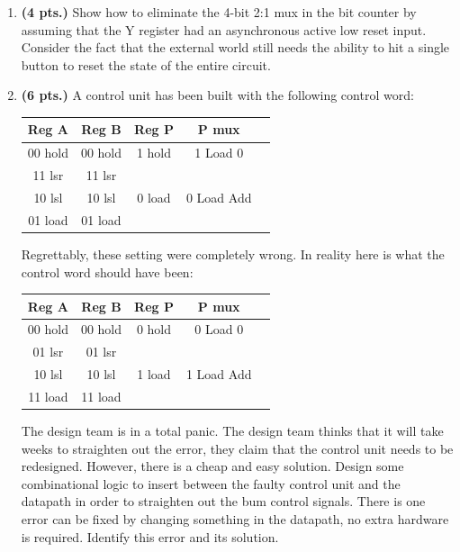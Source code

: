 \begin{enumerate}
\item {\bf (4 pts.)}
Show how to eliminate the 4-bit 2:1 mux in the bit counter by
assuming that the Y register had an asynchronous active low reset input.
Consider the fact that the external world still needs the ability to hit
a single button to reset the state of the entire circuit. 

\item  {\bf (6 pts.)}
A control unit has been built with the following control word:

\begin{tabular}{|c|c|c|c|c|}  \hline
Reg A       & Reg B         &  Reg P        & P mux         \\ \hline
00 hold     & 00 hold       &  1 hold       & 1 Load 0      \\ \hline
11 lsr      & 11 lsr        &               &               \\ \hline
10 lsl      & 10 lsl        &  0 load       & 0 Load Add    \\ \hline
01 load     & 01 load       &               &               \\ \hline 
\end{tabular}

Regrettably, these setting were completely wrong.  In reality here is what the control word should
have been:

\begin{tabular}{|c|c|c|c|c|}  \hline
Reg A       & Reg B         &  Reg P        & P mux         \\ \hline
00 hold     & 00 hold       &  0 hold       & 0 Load 0      \\ \hline
01 lsr      & 01 lsr        &               &               \\ \hline
10 lsl      & 10 lsl        &  1 load       & 1 Load Add    \\ \hline
11 load     & 11 load       &               &               \\ \hline 
\end{tabular}

The design team is in a total panic.
The design team thinks that it will take weeks to straighten out the error, 
they claim that the control unit needs to be redesigned.  However, there is
a cheap and easy solution.  Design some combinational 
logic to insert between the faulty control unit and the datapath in order
to straighten out the bum control signals.  There is one error can be 
fixed by changing something in the datapath, no extra hardware is 
required.  Identify this error and its solution.


\end{enumerate}
